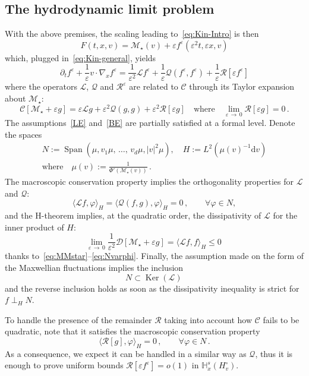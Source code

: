 \documentclass[AHL,Unicode,longabstracts,published]{cedram}
\DeclareMathOperator{\Span}{Span}
\DeclareMathOperator{\nul}{Ker}
\renewcommand{\d}{\mathrm{d}}
\newcommand{\bbH}{\mathbb{H}}
\newcommand{\CC}{\mathcal{C}}
\newcommand{\DD}{\mathcal{D}}
\newcommand{\LL}{\mathcal{L}}
\newcommand{\MM}{\mathcal{M}}
\newcommand{\QQ}{\mathcal{Q}}
\newcommand{\RR}{\mathcal{R}}
\renewcommand*\le{\leqslant}
\newcommand*\eps{{\varepsilon}}
\newcommand{\la}{\langle}
\newcommand{\ra}{\rangle}
\let\oldforall\forall
\renewcommand*{\forall}{\mathrel{\oldforall}}
\begin{document}
\subsection*{The hydrodynamic limit problem}

With the above premises, the scaling leading to~\eqref{eq:Kin-Intro} is then
\[
F(t, x, v) = \MM_\star(v) + \eps f^\eps\left(\eps^2 t, \eps x, v\right)
\]
which, plugged in~\eqref{eq:Kin-general}, yields
\[
\partial_t f^\eps + \frac{1}{\eps} v \cdot \nabla_x f^\eps = \frac{1}{\eps^2} \LL f^\eps + \frac{1}{\eps} \QQ\left(f^\eps, f^\eps\right) + \frac{1}{\eps} \RR\left[\eps f^\eps\right]
\]
where the operators $\LL$, $\QQ$ and $\RR^\eps$ are related to $\CC$ through its Taylor expansion about $\MM_\star$:
\[
\CC\left[\MM_\star + \eps g \right] = \eps \LL g + \eps^2 \QQ(g, g) + \eps^2 \RR[\eps g]\quad \text{where} \quad \lim\limits_{\eps\,\to\,0} \RR[\eps g] = 0 \,.
\]
The assumptions~\eqref{LE} and~\eqref{BE} are partially satisfied at a formal level. Denote the spaces
\begin{multline*}
N := \Span\left(\mu, v_1 \mu,\,\dots,\,v_d \mu, |v|^2 \mu\right), \quad H := L^2\left(\mu(v)^{-1} \d v\right)\\
\text{where} \quad \mu(v) := \frac{1}{\Phi'(\MM_\star(v))} \,.
\end{multline*}
The macroscopic conservation property implies the orthogonality properties for $\LL$ and $\QQ$:
\begin{equation}\label{eq:Nvarphi}
\la \LL f, \varphi \ra_H = \la \QQ(f, g), \varphi \ra_H = 0 \,, \qquad \forall \varphi \in N,
\end{equation}
and the H-theorem implies, at the quadratic order, the dissipativity of $\LL$ for the inner product of $H$:
\[
\lim_{\eps\,\to\,0}\frac{1}{\eps^{2}} \DD[\MM_{\star}+\eps g] = \la \LL f, f \ra_H \le 0 \,
\]
thanks to~\eqref{eq:MMstar}--\eqref{eq:Nvarphi}. Finally, the assumption made on the form of the Maxwellian fluctuations implies the inclusion
\[
N \subset \nul(\LL) \,
\]
and the reverse inclusion holds as soon as the dissipativity inequality is strict for $f \perp_H N$.

To handle the presence of the remainder $\RR$ taking into account how $\CC$ fails to be quadratic, note that it satisfies the macroscopic conservation property
\[
\la \RR[g], \varphi \ra_H = 0 \,, \qquad \forall \varphi \in N \,.
\]
As a consequence, we expect it can be handled in a similar way as $\QQ$, thus it is enough to prove uniform bounds $ \RR [\eps f^\eps] = o(1)$ in $\bbH^s_x(H^{\circ}_v)$.
\end{document}
